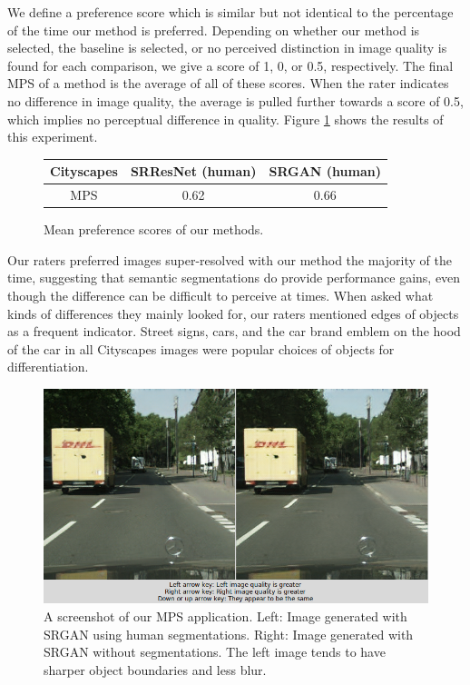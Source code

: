 \documentclass[10pt,twocolumn,letterpaper]{article}
\begin{document}
We define a preference score which is similar but not identical to the
percentage of the time our method is preferred. Depending on whether our method
is selected, the baseline is selected, or no perceived distinction in image
quality is found for each comparison, we give a score of 1, 0, or 0.5,
respectively. The final MPS of a method is the average of all of these scores.
When the rater indicates no difference in image quality, the average is pulled
further towards a score of 0.5, which implies no perceptual difference in
quality. Figure \ref{fig:mps} shows the results of this experiment.

\begin{figure}[ht!]
    \begin{center}
        \small
        \begin{tabular}{c cc}
            \textbf{Cityscapes} & SRResNet (human) & SRGAN (human) \\
            \hline
            MPS & 0.62 & 0.66
        \end{tabular}
    \end{center}
    \caption{Mean preference scores of our methods.}
    \label{fig:mps}
\end{figure}

Our raters preferred images super-resolved with our method the majority of the
time, suggesting that semantic segmentations do provide performance gains, even
though the difference can be difficult to perceive at times. When asked what
kinds of differences they mainly looked for, our raters mentioned edges of
objects as a frequent indicator. Street signs, cars, and the car brand emblem
on the hood of the car in all Cityscapes images were popular choices of objects
for differentiation.

\begin{figure}[ht!]
    \begin{center}
        \includegraphics[trim=0 0 0 0, clip,
            width=6in]{images/mps.png}
    \end{center}
    \caption{A screenshot of our MPS application. Left: Image generated with SRGAN
    using human segmentations. Right: Image generated with SRGAN without
    segmentations. The left image tends to have sharper object boundaries and
    less blur.}
\end{figure}
\end{document}
